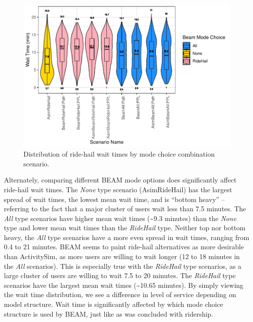\documentclass[fancy, masters]{byuthesis}
\begin{document}
\begin{figure}

{\centering \includegraphics{thesis_files/figure-latex/waits-1} 

}

\caption[Distribution of ride-hail wait times.]{Distribution of ride-hail wait times by mode choice combination scenario.}\label{fig:waits}
\end{figure}

Alternately, comparing different BEAM mode options does significantly affect ride-hail wait times. The \emph{None} type scenario (AsimRideHail) has the largest spread of wait times, the lowest mean wait time, and is ``bottom heavy'' -- referring to the fact that a major cluster of users wait less than 7.5 minutes. The \emph{All} type scenarios have higher mean wait times (\textasciitilde9.3 minutes) than the \emph{None} type and lower mean wait times than the \emph{RideHail} type. Neither top nor bottom heavy, the \emph{All} type scenarios have a more even spread in wait times, ranging from 0.4 to 21 minutes. BEAM seems to paint ride-hail alternatives as more desirable than ActivitySim, as more users are willing to wait longer (12 to 18 minutes in the \emph{All} scenarios). This is especially true with the \emph{RideHail} type scenarios, as a large cluster of users are willing to wait 7.5 to 20 minutes. The \emph{RideHail} type scenarios have the largest mean wait times (\textasciitilde10.65 minutes). By simply viewing the wait time distribution, we see a difference in level of service depending on model structure. Wait time is significantly affected by which mode choice structure is used by BEAM, just like as was concluded with ridership.
\end{document}
